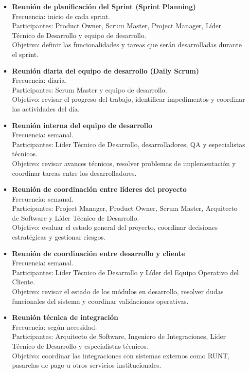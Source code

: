 \begin{itemize}

\item \textbf{Reunión de planificación del Sprint (Sprint Planning)} \\
Frecuencia: inicio de cada sprint. \\
Participantes: Product Owner, Scrum Master, Project Manager, Líder Técnico de Desarrollo y equipo de desarrollo. \\
Objetivo: definir las funcionalidades y tareas que serán desarrolladas durante el sprint.

\item \textbf{Reunión diaria del equipo de desarrollo (Daily Scrum)} \\
Frecuencia: diaria. \\
Participantes: Scrum Master y equipo de desarrollo. \\
Objetivo: revisar el progreso del trabajo, identificar impedimentos y coordinar las actividades del día.

\item \textbf{Reunión interna del equipo de desarrollo} \\
Frecuencia: semanal. \\
Participantes: Líder Técnico de Desarrollo, desarrolladores, QA y especialistas técnicos. \\
Objetivo: revisar avances técnicos, resolver problemas de implementación y coordinar tareas entre los desarrolladores.

\item \textbf{Reunión de coordinación entre líderes del proyecto} \\
Frecuencia: semanal. \\
Participantes: Project Manager, Product Owner, Scrum Master, Arquitecto de Software y Líder Técnico de Desarrollo. \\
Objetivo: evaluar el estado general del proyecto, coordinar decisiones estratégicas y gestionar riesgos.

\item \textbf{Reunión de coordinación entre desarrollo y cliente} \\
Frecuencia: semanal. \\
Participantes: Líder Técnico de Desarrollo y Líder del Equipo Operativo del Cliente. \\
Objetivo: revisar el estado de los módulos en desarrollo, resolver dudas funcionales del sistema y coordinar validaciones operativas.

\item \textbf{Reunión técnica de integración} \\
Frecuencia: según necesidad. \\
Participantes: Arquitecto de Software, Ingeniero de Integraciones, Líder Técnico de Desarrollo y especialistas técnicos. \\
Objetivo: coordinar las integraciones con sistemas externos como RUNT, pasarelas de pago u otros servicios institucionales.


\end{itemize}
